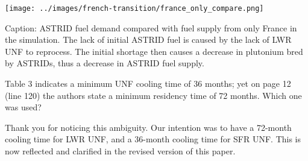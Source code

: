 \documentclass[answers,11pt]{exam}
\begin{document}
\begin{questions}
\begin{solution}
		\texttt{[image: ../images/french-transition/france\_only\_compare.png]}

                Caption: \gls{ASTRID} fuel demand compared with fuel supply from only
			 France in the simulation. The lack of initial \gls{ASTRID} fuel
			 is caused by the lack of \gls{LWR} \gls{UNF} to reprocess. The
			 initial shortage then causes a decrease in plutonium bred by
			 \glspl{ASTRID}, thus a decrease in \gls{ASTRID} fuel supply.


        \end{solution}

        \question Table 3 indicates a minimum UNF cooling time of 36 months; 
        yet on page 12 (line 120) the authors state a minimum residency time of 
        72 months. Which one was used?

        \begin{solution}
        	Thank you for noticing this ambiguity. Our intention was to have a 72-month
        	cooling time for LWR UNF, and a 36-month cooling time for SFR UNF.
        	This is now reflected and clarified in the revised version of
        	this paper.
        \end{solution}


\end{questions}
\end{document}

